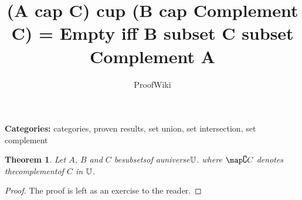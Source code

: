 \documentclass{article}
\title{(A cap C) cup (B cap Complement C) = Empty iff B subset C subset Complement A}
\author{ProofWiki}
\date{}
\newtheorem{theorem}{Theorem}
\begin{document}
\maketitle

\noindent\textbf{Categories:} categories, proven results, set union, set intersection, set complement

\begin{theorem}
Let $A$, $B$ and $C$ besubsetsof auniverse$\Bbb U$. where $\map \complement C$ denotes thecomplementof $C$ in $\Bbb U$.
\end{theorem}

\begin{proof}
The proof is left as an exercise to the reader.
\end{proof}
\end{document}
